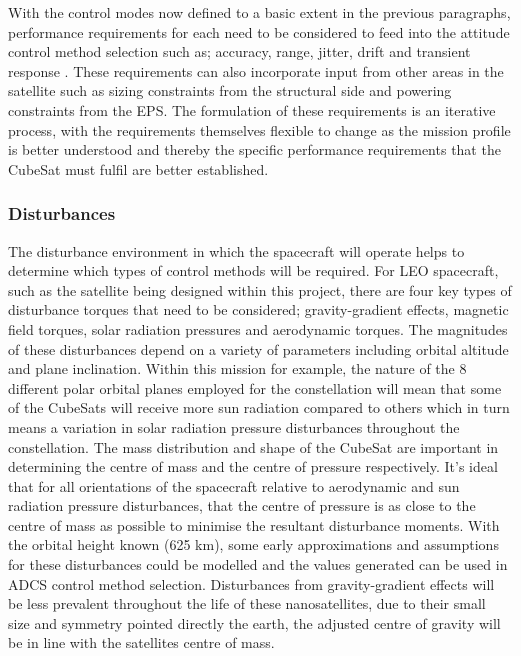 With the control modes now defined to a basic extent in the previous paragraphs, performance requirements for each need to be considered to feed into the attitude control method selection such as; accuracy, range, jitter, drift and transient response \cite{ADCS_nasa}. These requirements can also incorporate input from other areas in the satellite such as sizing constraints from the structural side and powering constraints from the EPS. The formulation of these requirements is an iterative process, with the requirements themselves flexible to change as the mission profile is better understood and thereby the specific performance requirements that the CubeSat must fulfil are better established.

\subsubsection{Disturbances}

The disturbance environment in which the spacecraft will operate helps to determine which types of control methods will be required. For LEO spacecraft, such as the satellite being designed within this project, there are four key types of disturbance torques that need to be considered; gravity-gradient effects, magnetic field torques, solar radiation pressures and aerodynamic torques. The magnitudes of these disturbances depend on a variety of parameters including orbital altitude and plane inclination. Within this mission for example, the nature of the 8 different polar orbital planes employed for the constellation will mean that some of the CubeSats will receive more sun radiation compared to others which in turn means a variation in solar radiation pressure disturbances throughout the constellation.
The mass distribution and shape of the CubeSat are important in determining the centre of mass and the centre of pressure respectively. It’s ideal that for all orientations of the spacecraft relative to aerodynamic and sun radiation pressure disturbances, that the centre of pressure is as close to the centre of mass as possible to minimise the resultant disturbance moments. With the orbital height known (625 km), some early approximations and assumptions for these disturbances could be modelled and the values generated can be used in ADCS control method selection. Disturbances from gravity-gradient effects will be less prevalent throughout the life of these nanosatellites, due to their small size and symmetry pointed directly the earth, the adjusted centre of gravity will be in line with the satellites centre of mass.

